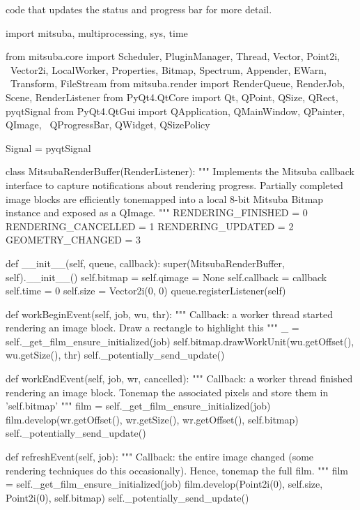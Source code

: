 code that updates the status and progress bar for more detail.
\begin{python}
import mitsuba, multiprocessing, sys, time

from mitsuba.core import Scheduler, PluginManager, Thread, Vector, Point2i, \
    Vector2i, LocalWorker, Properties, Bitmap, Spectrum, Appender, EWarn, \
    Transform, FileStream
from mitsuba.render import RenderQueue, RenderJob, Scene, RenderListener
from PyQt4.QtCore import Qt, QPoint, QSize, QRect, pyqtSignal
from PyQt4.QtGui import QApplication, QMainWindow, QPainter, QImage, \
    QProgressBar, QWidget, QSizePolicy

Signal = pyqtSignal

class MitsubaRenderBuffer(RenderListener):
    """
    Implements the Mitsuba callback interface to capture notifications about
    rendering progress. Partially completed image blocks are efficiently
    tonemapped into a local 8-bit Mitsuba Bitmap instance and exposed as a QImage.
    """
    RENDERING_FINISHED  = 0
    RENDERING_CANCELLED = 1
    RENDERING_UPDATED   = 2
    GEOMETRY_CHANGED    = 3

    def __init__(self, queue, callback):
        super(MitsubaRenderBuffer, self).__init__()
        self.bitmap = self.qimage = None
        self.callback = callback
        self.time = 0
        self.size = Vector2i(0, 0)
        queue.registerListener(self)

    def workBeginEvent(self, job, wu, thr):
        """ Callback: a worker thread started rendering an image block.
            Draw a rectangle to highlight this """
        _ = self._get_film_ensure_initialized(job)
        self.bitmap.drawWorkUnit(wu.getOffset(), wu.getSize(), thr)
        self._potentially_send_update()

    def workEndEvent(self, job, wr, cancelled):
        """ Callback: a worker thread finished rendering an image block.
            Tonemap the associated pixels and store them in 'self.bitmap' """
        film = self._get_film_ensure_initialized(job)
        film.develop(wr.getOffset(), wr.getSize(), wr.getOffset(), self.bitmap)
        self._potentially_send_update()

    def refreshEvent(self, job):
        """ Callback: the entire image changed (some rendering techniques
            do this occasionally). Hence, tonemap the full film. """
        film = self._get_film_ensure_initialized(job)
        film.develop(Point2i(0), self.size, Point2i(0), self.bitmap)
        self._potentially_send_update()


\end{python}
